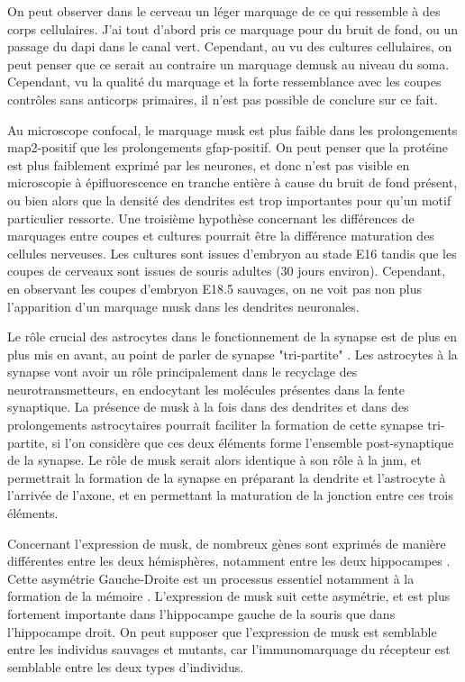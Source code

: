 On peut observer dans le cerveau un léger marquage de ce qui ressemble à des corps cellulaires. J'ai tout d'abord pris ce marquage pour du bruit de fond, ou un passage du \acrshort{dapi} dans le canal vert. Cependant, au vu des cultures cellulaires, on peut penser que ce serait au contraire un marquage de\gls{musk} au niveau du soma. Cependant, vu la qualité du marquage et la forte ressemblance avec les coupes contrôles sans anticorps primaires, il n'est pas possible de conclure sur ce fait.

Au microscope confocal, le marquage \gls{musk} est plus faible dans les prolongements \gls{map2}-positif  que les prolongements \gls{gfap}-positif. On peut penser que la protéine est plus faiblement exprimé par les neurones, et donc n'est pas visible en microscopie à épifluorescence en tranche entière à cause du bruit de fond présent, ou bien alors que la densité des dendrites est trop importantes pour qu'un motif particulier ressorte. Une troisième hypothèse concernant les différences de marquages entre coupes et cultures pourrait être la différence maturation des  cellules nerveuses. Les cultures sont issues d'embryon au stade E16 tandis que les coupes de cerveaux sont issues de souris adultes (30 jours environ). Cependant, en observant les coupes d'embryon E18.5 sauvages, on ne voit pas non plus l'apparition d'un marquage \gls{musk} dans les dendrites neuronales.

Le rôle crucial des astrocytes dans le fonctionnement de la synapse est de plus en plus mis en avant, au point de parler de synapse "tri-partite" \cite{Araque1999, Perea2009}. Les astrocytes à la synapse vont avoir un rôle principalement dans le recyclage des neurotransmetteurs, en endocytant les molécules présentes dans la fente synaptique. La présence de \gls{musk} à la fois dans des dendrites et dans des prolongements astrocytaires pourrait faciliter la formation de cette synapse tri-partite, si l'on considère que ces deux éléments forme l'ensemble post-synaptique de la synapse. Le rôle de \gls{musk} serait alors identique à son rôle à la \gls{jnm}, et permettrait la formation de la synapse en préparant la dendrite et l'astrocyte à l'arrivée de l'axone, et en permettant la maturation de la jonction entre ces trois éléments.

Concernant l'expression de \gls{musk}, de nombreux gènes sont exprimés de manière différentes entre les deux hémisphères, notamment entre les deux hippocampes \cite{Moskal2006}. Cette asymétrie Gauche-Droite est un processus essentiel notamment à la formation de la mémoire \cite{Shimbo2018}. L'expression de \gls{musk} suit cette asymétrie, et est plus fortement importante dans l'hippocampe gauche de la souris que dans l'hippocampe droit. On peut supposer que l'expression de \gls{musk} est semblable entre les individus sauvages et mutants, car l'immunomarquage du récepteur est semblable entre les deux types d'individus.

